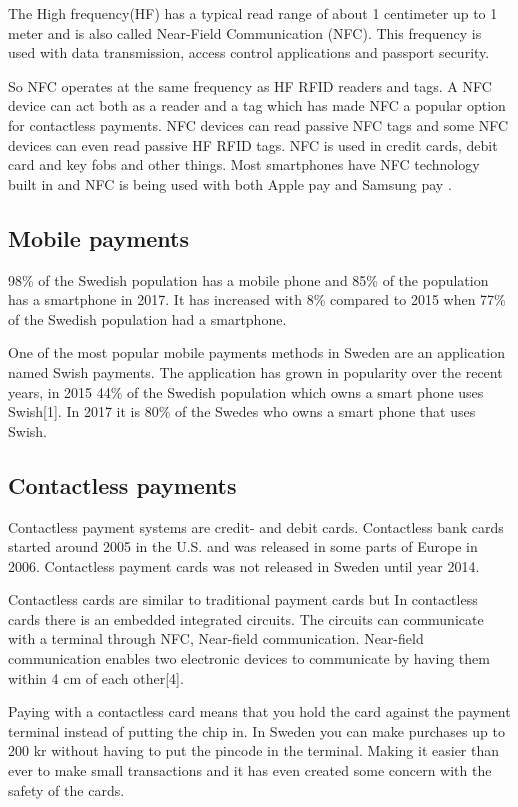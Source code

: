 \documentclass[runningheads,a4paper,oribibl]{llncs}
\begin{document}
The High frequency(HF) has a typical read range of about 1 centimeter up to 1 meter and is also called Near-Field Communication (NFC). This frequency is used with data transmission, access control applications and passport security.

So NFC operates at the same frequency as HF RFID readers and tags. A NFC device can act both as a reader and a tag which has made NFC a popular option for contactless payments. NFC devices can read passive NFC tags and some NFC devices can even read passive HF RFID tags. NFC is used in credit cards, debit card and key fobs and other things. Most smartphones have NFC technology built in and NFC is being used with both Apple pay and Samsung pay \cite{smartphone}.

\subsection{Mobile payments}

98\% of the Swedish population has a mobile phone and 85\% of the population has a smartphone in 2017. It has increased with 8\% compared to 2015 when 77\% of the Swedish population had a smartphone.~\cite{soi2017}


One of the most popular mobile payments methods in Sweden are an application named Swish payments. The application has grown in popularity over the recent years, in 2015 44\% of the Swedish population which owns a smart phone uses Swish[1]. In 2017 it is 80\% of the Swedes who owns a smart phone that uses Swish.


\subsection{Contactless payments}
Contactless payment systems are credit- and debit cards.
Contactless bank cards started around 2005 in the U.S. and was released in some parts of Europe in 2006. 
Contactless payment cards was not released in Sweden until year 2014.

Contactless cards are similar to traditional payment cards but In contactless cards there is an embedded integrated circuits. The circuits can communicate with a terminal through NFC, Near-field communication. Near-field communication enables two electronic devices to communicate by having them within 4 cm of each other[4]. 

Paying with a contactless card means that you hold the card against the payment terminal instead of putting the chip in. In Sweden you can make purchases up to 200 kr without having to put the pincode in the terminal. Making it easier than ever to make small transactions and it has even created some concern with the safety of the cards.
\end{document}
